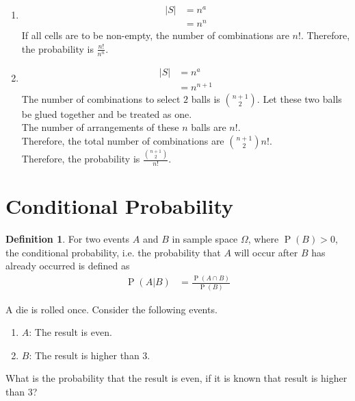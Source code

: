 \documentclass[titlepage, fleqn, a4paper, 12pt, twoside]{article}
\theoremstyle{definition}
\newtheorem{definition}{Definition}
\theoremstyle{theorem}
\DeclareMathOperator{\prob}{\mathrm{P}}
\begin{document}
\begin{solution}
	\begin{enumerate}[leftmargin=*]
		\item
			\begin{align*}
				|S| & = n^a \\
                                    & = n^n
			\end{align*}
			If all cells are to be non-empty, the number of combinations are $n!$.
			Therefore, the probability is $\frac{n!}{n^n}$.
		\item
			\begin{align*}
				|S| & = n^a \\
                                    & = n^{n + 1}
			\end{align*}
			The number of combinations to select $2$ balls is $\binom{n + 1}{2}$.
			Let these two balls be glued together and be treated as one.\\
			The number of arrangements of these $n$ balls are $n!$.\\
			Therefore, the total number of combinations are $\binom{n + 1}{2} n!$.\\
			Therefore, the probability is $\frac{\binom{n + 1}{2}}{n!}$.
	\end{enumerate}
\end{solution}

\section{Conditional Probability}

\begin{definition}
	For two events $A$ and $B$ in sample space $\Omega$, where $\prob(B) > 0$, the conditional probability, i.e. the probability that $A$ will occur after $B$ has already occurred is defined as
	\begin{align*}
		\prob(A|B) & = \frac{\prob(A \cap B)}{\prob(B)}
	\end{align*}
\end{definition}

\begin{question}
	A die is rolled once.
	Consider the following events.
	\begin{enumerate}
		\item $A$: The result is even.
		\item $B$: The result is higher than $3$.
	\end{enumerate}
	What is the probability that the result is even, if it is known that result is higher than $3$?
\end{question}
\end{document}

